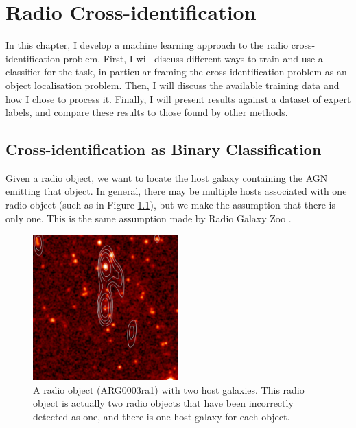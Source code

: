 
\chapter{Radio Cross-identification}
\label{cha:passive-learning}

  In this chapter, I develop a machine learning approach to the radio cross-identification problem. First, I will discuss different ways to train and use a classifier for the task, in particular framing the cross-identification problem as an object localisation problem. Then, I will discuss the available training data and how I chose to process it. Finally, I will present results against a dataset of expert labels, and compare these results to those found by other methods.

\section{Cross-identification as Binary Classification}
\label{sec:framing-as-classification}
  
  Given a radio object, we want to locate the host galaxy containing the AGN emitting that object. In general, there may be multiple hosts associated with one radio object (such as in Figure \ref{fig:two-hosts}), but we make the assumption that there is only one. This is the same assumption made by Radio Galaxy Zoo .

  \begin{figure}[!ht]
    \centering
    \includegraphics[width=0.5\textwidth]{images/CI0370C1_heatmap+contours.png}
    \caption{A radio object (ARG0003ra1) with two host galaxies. This radio
      object is actually two radio objects that have been incorrectly detected
      as one, and there is one host galaxy for each object.}
    \label{fig:two-hosts}
  \end{figure}

